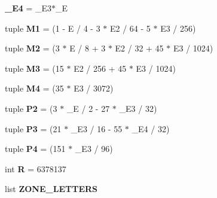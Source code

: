 \begin{DoxyCompactItemize}
\item 
\hypertarget{namespacecore_1_1misc_1_1utm_a250c7ce06a1eac59ab1dad5b2d7f4629}{{\bfseries \+\_\+\+E4} = \+\_\+\+E3$\ast$\+\_\+\+E}\label{namespacecore_1_1misc_1_1utm_a250c7ce06a1eac59ab1dad5b2d7f4629}

\item 
\hypertarget{namespacecore_1_1misc_1_1utm_aa9c513a836ab78dadda2aa2039d30246}{tuple {\bfseries M1} = (1 -\/ E / 4 -\/ 3 $\ast$ E2 / 64 -\/ 5 $\ast$ E3 / 256)}\label{namespacecore_1_1misc_1_1utm_aa9c513a836ab78dadda2aa2039d30246}

\item 
\hypertarget{namespacecore_1_1misc_1_1utm_a197e9884087c39ad6d86ef1494e7e41d}{tuple {\bfseries M2} = (3 $\ast$ E / 8 + 3 $\ast$ E2 / 32 + 45 $\ast$ E3 / 1024)}\label{namespacecore_1_1misc_1_1utm_a197e9884087c39ad6d86ef1494e7e41d}

\item 
\hypertarget{namespacecore_1_1misc_1_1utm_ac688c2ec2921cc017ca0411cfed30eb9}{tuple {\bfseries M3} = (15 $\ast$ E2 / 256 + 45 $\ast$ E3 / 1024)}\label{namespacecore_1_1misc_1_1utm_ac688c2ec2921cc017ca0411cfed30eb9}

\item 
\hypertarget{namespacecore_1_1misc_1_1utm_afa46e92bab0fa997527cd815f3646897}{tuple {\bfseries M4} = (35 $\ast$ E3 / 3072)}\label{namespacecore_1_1misc_1_1utm_afa46e92bab0fa997527cd815f3646897}

\item 
\hypertarget{namespacecore_1_1misc_1_1utm_ad3170412ae927ffb2da7ef5ddbcde9b2}{tuple {\bfseries P2} = (3 $\ast$ \+\_\+\+E / 2 -\/ 27 $\ast$ \+\_\+\+E3 / 32)}\label{namespacecore_1_1misc_1_1utm_ad3170412ae927ffb2da7ef5ddbcde9b2}

\item 
\hypertarget{namespacecore_1_1misc_1_1utm_a5d565816b7eaa83f2bc75b7f778eaf09}{tuple {\bfseries P3} = (21 $\ast$ \+\_\+\+E3 / 16 -\/ 55 $\ast$ \+\_\+\+E4 / 32)}\label{namespacecore_1_1misc_1_1utm_a5d565816b7eaa83f2bc75b7f778eaf09}

\item 
\hypertarget{namespacecore_1_1misc_1_1utm_a748df623d407384d72c1186ed54aa02a}{tuple {\bfseries P4} = (151 $\ast$ \+\_\+\+E3 / 96)}\label{namespacecore_1_1misc_1_1utm_a748df623d407384d72c1186ed54aa02a}

\item 
\hypertarget{namespacecore_1_1misc_1_1utm_a08603dfded528a3c8e59cd889d4a4a72}{int {\bfseries R} = 6378137}\label{namespacecore_1_1misc_1_1utm_a08603dfded528a3c8e59cd889d4a4a72}

\item 
list {\bfseries Z\+O\+N\+E\+\_\+\+L\+E\+T\+T\+E\+R\+S}
\end{DoxyCompactItemize}


